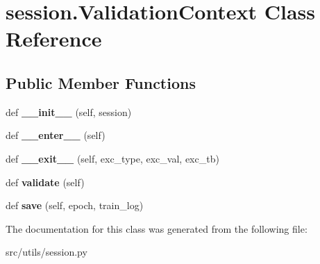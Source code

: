 \hypertarget{classsession_1_1ValidationContext}{}\section{session.\+Validation\+Context Class Reference}
\label{classsession_1_1ValidationContext}
\subsection*{Public Member Functions}
\begin{DoxyCompactItemize}
\item 
def {\bfseries \+\_\+\+\_\+init\+\_\+\+\_\+} (self, session)\hypertarget{classsession_1_1ValidationContext_a90060210e34a2a503f873ad62d203b1b}{}\label{classsession_1_1ValidationContext_a90060210e34a2a503f873ad62d203b1b}

\item 
def {\bfseries \+\_\+\+\_\+enter\+\_\+\+\_\+} (self)\hypertarget{classsession_1_1ValidationContext_a78221401bb4524d2cf00eea1db42a4b6}{}\label{classsession_1_1ValidationContext_a78221401bb4524d2cf00eea1db42a4b6}

\item 
def {\bfseries \+\_\+\+\_\+exit\+\_\+\+\_\+} (self, exc\+\_\+type, exc\+\_\+val, exc\+\_\+tb)\hypertarget{classsession_1_1ValidationContext_a5ab18b361676f1fed5b530ac3859f340}{}\label{classsession_1_1ValidationContext_a5ab18b361676f1fed5b530ac3859f340}

\item 
def {\bfseries validate} (self)\hypertarget{classsession_1_1ValidationContext_a2cbc10b37030cd6ce513eb21eb2fd5e5}{}\label{classsession_1_1ValidationContext_a2cbc10b37030cd6ce513eb21eb2fd5e5}

\item 
def {\bfseries save} (self, epoch, train\+\_\+log)\hypertarget{classsession_1_1ValidationContext_a77aa568ea9d2c33dd3649182595102cf}{}\label{classsession_1_1ValidationContext_a77aa568ea9d2c33dd3649182595102cf}

\end{DoxyCompactItemize}


The documentation for this class was generated from the following file\+:\begin{DoxyCompactItemize}
\item 
src/utils/session.\+py\end{DoxyCompactItemize}

